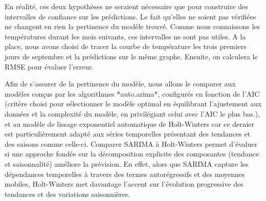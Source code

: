 \documentclass{article}
\theoremstyle{definition}
\theoremstyle{remark}
\begin{document}
En réalité, ces deux hypothèses ne seraient nécessaire que pour construire des intervalles de confiance sur les prédictions. Le fait qu'elles ne soient pas vérifiées ne changent en rien la pertinence du modèle trouvé. Comme nous connaissons les températures durant les mois suivants, ces intervalles ne sont pas utiles. A la place, nous avons choisi de tracer la courbe de température les trois premiers jours de septembre et la prédictions sur le même graphe. Ensuite, on calculera le RMSE pour évaluer l'erreur.\newline

Afin de s'assurer de la pertinence du modèle, nous allons le comparer aux modèles conçus par les algorithmes *auto.arima*, configurés en fonction de l'AIC (critère choisi pour sélectionner le modèle optimal en équilibrant l'ajustement aux données et la complexité du modèle, en privilégiant celui avec l'AIC le plus bas.), et au modèle de lissage exponentiel automatique de Holt-Winters car ce dernier est particulièrement adapté aux séries temporelles présentant des tendances et des saisons comme celle-ci. Comparer SARIMA à Holt-Winters permet d’évaluer si une approche fondée sur la décomposition explicite des composantes (tendance et saisonnalité) améliore la prévision. En effet, alors que SARIMA capture les dépendances temporelles à travers des termes autorégressifs et des moyennes mobiles, Holt-Winters met davantage l’accent sur l’évolution progressive des tendances et des variations saisonnières.
\end{document}
